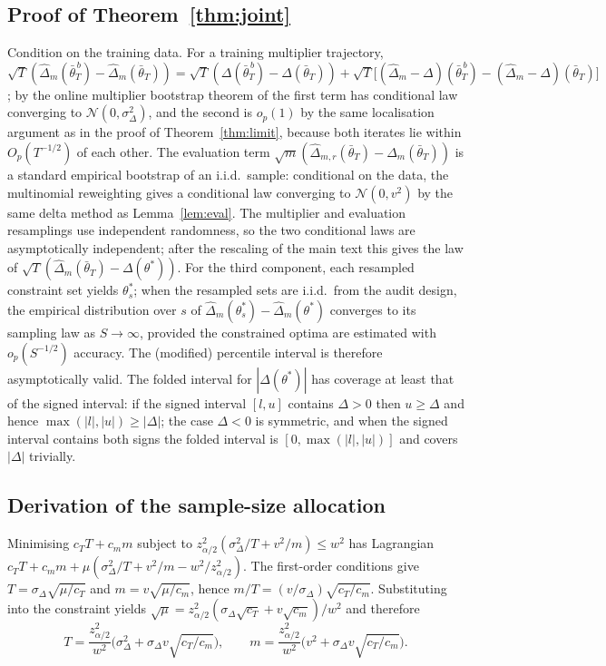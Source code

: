\documentclass[10pt,twocolumn]{article}
\newcommand{\dhat}{\hat\Delta}
\newcommand{\tbar}{\bar\theta}
\begin{document}
\subsection{Proof of Theorem~\ref{thm:joint}}
Condition on the training data.  For a training multiplier trajectory,
$\sqrt T(\dhat_m(\bar\theta_T^{\,b})-\dhat_m(\tbar_T))=\sqrt T(\Delta(\bar\theta_T^{\,b})-\Delta(\tbar_T))+\sqrt T\big[(\dhat_m-\Delta)(\bar\theta_T^{\,b})-(\dhat_m-\Delta)(\tbar_T)\big]$;
by the online multiplier bootstrap theorem of \citet{roy2026uq} the first term has conditional law
converging to $\mathcal N(0,\sigma^2_\Delta)$, and the second is $o_p(1)$ by the same localisation
argument as in the proof of Theorem~\ref{thm:limit}, because both iterates lie within
$O_p(T^{-1/2})$ of each other.  The evaluation term
$\sqrt m(\dhat_{m,r}(\tbar_T)-\dhat_m(\tbar_T))$ is a standard empirical bootstrap of an i.i.d.\
sample: conditional on the data, the multinomial reweighting gives a conditional law converging to
$\mathcal N(0,v^2)$ by the same delta method as Lemma~\ref{lem:eval}.  The multiplier and evaluation
resamplings use independent randomness, so the two conditional laws are asymptotically independent;
after the rescaling of the main text this gives the law of
$\sqrt T(\dhat_m(\tbar_T)-\Delta(\theta^*))$.  For the third component, each resampled constraint set
yields $\theta^*_s$; when the resampled sets are i.i.d.\ from the audit design, the empirical
distribution over $s$ of $\dhat_m(\theta^*_s)-\dhat_m(\theta^*)$ converges to its sampling law as
$S\to\infty$, provided the constrained optima are estimated with $o_p(S^{-1/2})$ accuracy.  The
(modified) percentile interval is therefore asymptotically valid.  The folded interval for
$|\Delta(\theta^*)|$ has coverage at least that of the signed interval: if the signed interval $[l,u]$
contains $\Delta>0$ then $u\ge\Delta$ and hence $\max(|l|,|u|)\ge|\Delta|$; the case $\Delta<0$ is
symmetric, and when the signed interval contains both signs the folded interval is $[0,\max(|l|,|u|)]$
and covers $|\Delta|$ trivially.

\subsection{Derivation of the sample-size allocation}
Minimising $c_T T+c_m m$ subject to $z^2_{\alpha/2}(\sigma^2_\Delta/T+v^2/m)\le w^2$ has Lagrangian
$c_T T+c_m m+\mu(\sigma^2_\Delta/T+v^2/m-w^2/z^2_{\alpha/2})$.  The first-order conditions give
$T=\sigma_\Delta\sqrt{\mu/c_T}$ and $m=v\sqrt{\mu/c_m}$, hence
$m/T=(v/\sigma_\Delta)\sqrt{c_T/c_m}$.  Substituting into the constraint yields
$\sqrt\mu=z^2_{\alpha/2}(\sigma_\Delta\sqrt{c_T}+v\sqrt{c_m})/w^2$ and therefore
\[
T=\frac{z^2_{\alpha/2}}{w^2}\Big(\sigma^2_\Delta+\sigma_\Delta v\sqrt{c_T/c_m}\Big),
\qquad
m=\frac{z^2_{\alpha/2}}{w^2}\Big(v^2+\sigma_\Delta v\sqrt{c_T/c_m}\Big).
\]
\end{document}
